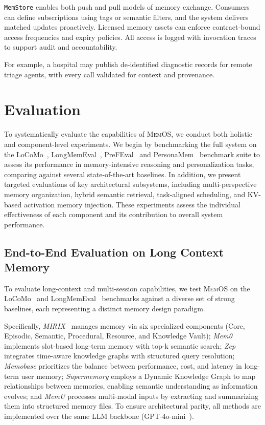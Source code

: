 \documentclass[]{memtensor}
\begin{document}
\texttt{MemStore} enables both push and pull models of memory exchange.
Consumers can define subscriptions using tags or semantic filters, and the system delivers matched updates proactively.
Licensed memory assets can enforce contract-bound access frequencies and expiry policies.
All access is logged with invocation traces to support audit and accountability.

For example, a hospital may publish de-identified diagnostic records for remote triage agents, with every call validated for context and provenance.

\section{Evaluation}

To systematically evaluate the capabilities of \textsc{MemOS}, we conduct both holistic and component-level experiments.
We begin by benchmarking the full system on the LoCoMo~\cite{maharana2024evaluating}, LongMemEval~\cite{wu2024longmemeval}, PreFEval~\cite{zhao2025llms} and PersonaMem~\cite{jiang2025know} benchmark suite to assess its performance in memory-intensive reasoning and personalization tasks, comparing against several state-of-the-art baselines.
In addition, we present targeted evaluations of key architectural subsystems, including multi-perspective memory organization, hybrid semantic retrieval, task-aligned scheduling, and KV-based activation memory injection. These experiments assess the individual effectiveness of each component and its contribution to overall system performance.

\subsection{End-to-End Evaluation on Long Context Memory}\label{sec:long_context_memory}

%

To evaluate long-context and multi-session capabilities, we test \textsc{MemOS} on the LoCoMo~\cite{maharana2024evaluating} and LongMemEval~\cite{wu2024longmemeval} benchmarks against a diverse set of strong baselines, each representing a distinct memory design paradigm.

Specifically, \textit{MIRIX}~\cite{wang2025mirix} manages memory via six specialized components (Core, Episodic, Semantic, Procedural, Resource, and Knowledge Vault);
\textit{Mem0}~\cite{chhikara2025mem0} implements slot-based long-term memory with top-k semantic search;
\textit{Zep}~\cite{rasmussen2025zep} integrates time-aware knowledge graphs with structured query resolution;
\textit{Memobase} prioritizes the balance between performance, cost, and latency in long-term user memory;
\textit{Supermemory} employs a Dynamic Knowledge Graph to map relationships between memories, enabling semantic understanding as information evolves;
and \textit{MemU} processes multi-modal inputs by extracting and summarizing them into structured memory files.
To ensure architectural parity, all methods are implemented over the same LLM backbone (GPT-4o-mini~\cite{achiam_2023_gpt4}).
\end{document}
